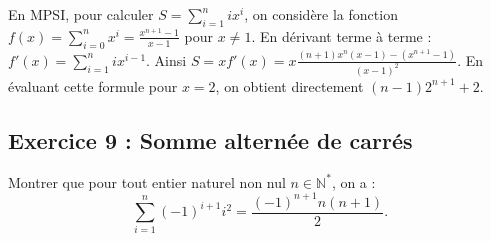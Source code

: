 \documentclass[11pt,a4paper]{article}
\newcommand{\N}{\mathbb{N}}
\begin{document}
\begin{remarquabox}
En MPSI, pour calculer $S = \sum_{i=1}^n i x^i$, on considère la fonction $f(x) = \sum_{i=0}^n x^i = \frac{x^{n+1}-1}{x-1}$ pour $x \neq 1$.
En dérivant terme à terme : $f'(x) = \sum_{i=1}^n i x^{i-1}$.
Ainsi $S = x f'(x) = x \frac{(n+1)x^n(x-1) - (x^{n+1}-1)}{(x-1)^2}$.
En évaluant cette formule pour $x = 2$, on obtient directement $(n-1)2^{n+1} + 2$.
\end{remarquabox}

\subsection*{Exercice 9 : Somme alternée de carrés}

Montrer que pour tout entier naturel non nul $n \in \N^*$, on a :
\[
\sum_{i=1}^n (-1)^{i+1} i^2 = \frac{(-1)^{n+1} n(n+1)}{2}.
\]
\end{document}
